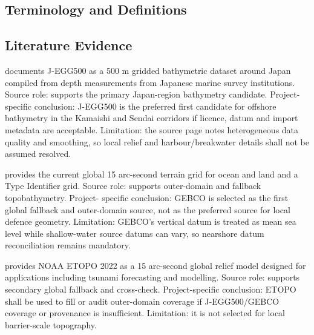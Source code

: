 \subsection{Terminology and Definitions}
\label{sec:res-dat-geo-definitions}


\subsection{Literature Evidence}
\label{sec:res-dat-geo-literature-evidence}

%

\textcite{jodcJegg500} documents J-EGG500 as a 500 m gridded
bathymetric dataset around Japan compiled from depth measurements from
Japanese marine survey institutions. Source role: supports the primary
Japan-region bathymetry candidate. Project-specific conclusion:
J-EGG500 is the preferred first candidate for offshore bathymetry in
the Kamaishi and Sendai corridors if licence, datum and import metadata
are acceptable. Limitation: the source page notes heterogeneous data
quality and smoothing, so local relief and harbour/breakwater details
shall not be assumed resolved.

\textcite{gebco2026grid} provides the current global 15 arc-second
terrain grid for ocean and land and a Type Identifier grid. Source
role: supports outer-domain and fallback topobathymetry. Project-
specific conclusion: GEBCO is selected as the first global fallback and
outer-domain source, not as the preferred source for local defence
geometry. Limitation: GEBCO's vertical datum is treated as mean sea
level while shallow-water source datums can vary, so nearshore datum
reconciliation remains mandatory.

\textcite{noaa2022etopo} provides NOAA ETOPO 2022 as a 15 arc-second
global relief model designed for applications including tsunami
forecasting and modelling. Source role: supports secondary global
fallback and cross-check. Project-specific conclusion: ETOPO shall be
used to fill or audit outer-domain coverage if J-EGG500/GEBCO coverage
or provenance is insufficient. Limitation: it is not selected for
local barrier-scale topography.


